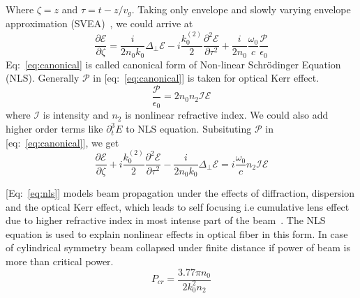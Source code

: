 \documentclass[../main.tex]{subfiles}
\begin{document}
	Where $\zeta = z$ and $\tau = t - z/v_g$.
	Taking only envelope and slowly varying envelope approximation
	(SVEA)~\cite{couairon_practitioners_2011},
	we could arrive at
	\begin{equation} \label{eq:canonical}
		\frac{\partial \mathcal{E}}{\partial \zeta} =
		\frac{i}{2n_0k_0}\Delta_\perp \mathcal{E} -
		i\frac{k_0^{(2)}}{2}
		\frac{\partial^2 \mathcal{E}}{\partial \tau^2} +
		\frac{i}{2n_0}\frac{\omega_0}{c}\frac{\mathcal{P}}{\epsilon_0}
	\end{equation}
	Eq:~\ref{eq:canonical} is called canonical form of Non-linear Schrödinger
	Equation (NLS). Generally $\mathcal{P}$ in [eq:~\ref{eq:canonical}] is
	taken for optical Kerr effect.
	\begin{equation} \label{eq:kerr}
		\frac{\mathcal{P}}{\epsilon_0} = 2n_0n_2\mathcal{I} \mathcal{E}
	\end{equation}
	where $\mathcal{I}$ is intensity and $n_2$ is nonlinear refractive
	index. We could also add higher order terms like $\partial_t^3 E$ to NLS
	equation. Subsituting $\mathcal{P}$ in [eq:~\ref{eq:canonical}],
	we get
	\begin{equation} \label{eq:nls}
		\frac{\partial \mathcal{E}}{\partial \zeta}
		+ i\frac{k_0^{(2)}}{2} \frac{\partial^2 \mathcal{E}}{\partial
		\tau^2} - \frac{i}{2n_0k_0}\Delta_\perp \mathcal{E}
		= i\frac{\omega_0}{c}n_2\mathcal{I} \mathcal{E}
	\end{equation}

	[Eq:~\ref{eq:nls}] models beam propagation under the effects of
	diffraction, dispersion and the optical Kerr effect, which leads to self
	focusing i.e cumulative lens effect due to higher refractive index in
	most intense part of the beam~\cite{couairon_practitioners_2011,
		couairon_femtosecond_2007}.
	The NLS equation is used to explain nonlinear effects in optical fiber
	in this form.
	In case of cylindrical symmetry beam
	collapsed under finite distance if power of beam is more than critical
	power.
	\begin{equation} \label{eq:Pcr}
		P_{cr} = \frac{3.77 \pi n_0}{2 k_0^2 n_2}
	\end{equation}
\end{document}
